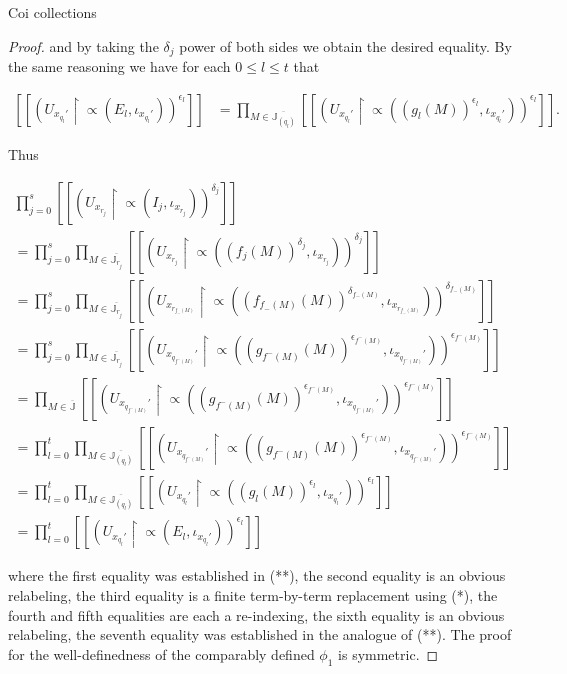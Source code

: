 \documentclass{amsart}
\theoremstyle{definition}\newtheorem{theorem}{Theorem}
\theoremstyle{definition}\newtheorem*{A}{Main Theorem}
\theoremstyle{definition}\newtheorem*{B}{Theorem \ref{elementaryequiv}}
\theoremstyle{definition}\newtheorem*{C}{Theorem \ref{continuous}}
\theoremstyle{definition}\newtheorem*{D}{Theorem \ref{bigisomorphism2}}
\theoremstyle{definition}\newtheorem{bigtheorem}{Main Theorem}
\numberwithin{theorem}{section}
\theoremstyle{definition}\newtheorem{corollary}[theorem]{Corollary}
\theoremstyle{definition}\newtheorem{proposition}[theorem]{Proposition}
\theoremstyle{definition}\newtheorem{definition}[theorem]{Definition}
\theoremstyle{definition}\newtheorem{question}[theorem]{Question}
\theoremstyle{definition}\newtheorem{example}[theorem]{Example}
\theoremstyle{definition}\newtheorem{remark}[theorem]{Remark}
\theoremstyle{definition}\newtheorem{note}[theorem]{Note}
\theoremstyle{definition}\newtheorem{lemma}[theorem]{Lemma}
\theoremstyle{definition}\newtheorem{fact}[theorem]{Fact}
\theoremstyle{definition}\newtheorem{define}[theorem]{Definition}
\theoremstyle{definition}\newtheorem{claim}[theorem]{Claim}
\theoremstyle{definition}\newtheorem{obs}[theorem]{Observation}
\theoremstyle{definition}\newtheorem{definitions}[theorem]{Definitions}
\begin{document}
\begin{section}{Coi collections}
\begin{proof}
\noindent and by taking the $\delta_j$ power of both sides we obtain the desired equality.  By the same reasoning we have for each $0 \leq l \leq t$ that  

$$
\begin{array}{ll}
[[(U_{x_{q_l}'} \upharpoonright \varpropto(E_l, \iota_{x_{q_l}'}))^{\epsilon_l}]] & =  \prod_{M \in \overline{\mathbb{J}_{(q_l)}}}[[(U_{x_{q_l}'} \upharpoonright \varpropto((g_l(M))^{\epsilon_l} , \iota_{x_{q_l}'}))^{\epsilon_l}]].
\end{array}
$$

\noindent Thus 

$$
\begin{array}{ll}
\prod_{j = 0}^s[[(U_{x_{r_j}}\upharpoonright \varpropto(I_j, \iota_{x_{r_j}}))^{\delta_j}]]\\
= \prod_{j = 0}^s \prod_{M \in \overline{\mathbb{J}_{r_j}}} [[(U_{x_{r_j}}\upharpoonright \varpropto((f_j(M))^{\delta_j}, \iota_{x_{r_j}}))^{\delta_j}]]\\
=  \prod_{j = 0}^s\prod_{M \in \overline{\mathbb{J}_{r_j}}}[[(U_{x_{r_{f_{-}(M)}}}\upharpoonright \varpropto((f_{f_{-}(M)}(M))^{\delta_{f_{-}(M)}} , \iota_{x_{r_{f_{-}(M)}}}))^{\delta_{f_{-}(M)}}]]\\
=  \prod_{j = 0}^s\prod_{M \in \overline{\mathbb{J}_{r_j}}}[[(U_{x_{q_{f^{-}(M)}}'} \upharpoonright \varpropto((g_{f^{-}(M)}(M))^{\epsilon_{f^{-}(M)}} , \iota_{x_{q_{f^{-}(M)}}'}))^{\epsilon_{f^{-}(M)}}]]\\
=  \prod_{M \in \overline{\mathbb{J}}}[[(U_{x_{q_{f^{-}(M)}}'} \upharpoonright \varpropto((g_{f^{-}(M)}(M))^{\epsilon_{f^{-}(M)}} , \iota_{x_{q_{f^{-}(M)}}'}))^{\epsilon_{f^{-}(M)}}]]\\
=  \prod_{l = 0}^t \prod_{M \in \overline{\mathbb{J}_{(q_l)}}}[[(U_{x_{q_{f^{-}(M)}}'} \upharpoonright \varpropto((g_{f^{-}(M)}(M))^{\epsilon_{f^{-}(M)}} , \iota_{x_{q_{f^{-}(M)}}'}))^{\epsilon_{f^{-}(M)}}]]\\
=  \prod_{l = 0}^t \prod_{M \in \overline{\mathbb{J}_{(q_l)}}}[[(U_{x_{q_l}'} \upharpoonright \varpropto((g_l(M))^{\epsilon_l} , \iota_{x_{q_l}'}))^{\epsilon_l}]]\\
= \prod_{l = 0}^t[[(U_{x_{q_l}'} \upharpoonright \varpropto(E_l, \iota_{x_{q_l}'}))^{\epsilon_l}]]
\end{array}
$$

\noindent where the first equality was established in (**), the second equality is an obvious relabeling, the third equality is a finite term-by-term replacement using (*), the fourth and fifth equalities are each a re-indexing, the sixth equality is an obvious relabeling, the seventh equality was established in the analogue of (**).  The proof for the well-definedness of the comparably defined $\phi_1$ is symmetric.
\end{proof}


\end{section}
\end{document}

